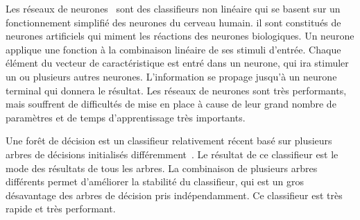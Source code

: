 Les réseaux de neurones~\cite{haykin1999neural} sont des classifieurs non linéaire qui se basent sur un fonctionnement simplifié des neurones du cerveau humain. il sont constitués de neurones artificiels qui miment les réactions des neurones biologiques. Un neurone applique une fonction à la combinaison linéaire de ses stimuli d'entrée. Chaque élément du vecteur de caractéristique est entré dans un neurone, qui ira stimuler un ou plusieurs autres neurones. L'information se propage jusqu'à un neurone terminal qui donnera le résultat. Les réseaux de neurones sont très performants, mais souffrent de difficultés de mise en place à cause de leur grand nombre de paramètres et de temps d'apprentissage très importants.

Une forêt de décision est un classifieur relativement récent basé sur plusieurs arbres de décisions initialisés différemment~\cite{ho1998random}. Le résultat de ce classifieur est le mode des résultats de tous les arbres. La combinaison de plusieurs arbres différents permet d'améliorer la stabilité du classifieur, qui est un gros désavantage des arbres de décision pris indépendamment. Ce classifieur est très rapide et très performant.